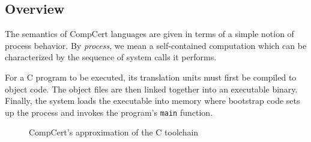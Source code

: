 \documentclass[sigplan,10pt,review,anonymous]{acmart}
\begin{document}

\subsection{Overview} \label{sec:sem:overview} %

The semantics of CompCert languages
are given in terms of a simple notion of process behavior.
By \emph{process}, we mean a self-contained computation
which can be characterized by
the sequence of system calls it performs.

For a C program to be executed,
its translation units must first be compiled to object code.
The object files are then linked together
into an executable binary.
Finally, the system loads the executable into memory
where bootstrap code sets up the process
and invokes the program's \texttt{main} function.

\begin{figure} %
    \caption{CompCert's approximation of the C toolchain}
    \label{fig:process}
\end{figure}
\end{document}
